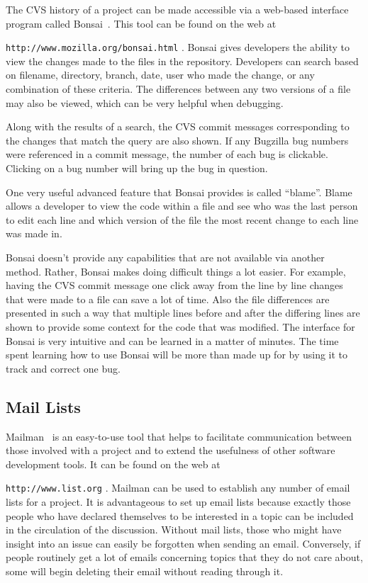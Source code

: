 \documentclass[12pt,relax]{article}
\newcommand{\InlineDirectory}[1]{
  {\hspace{0.01 in}} {\tt #1} {\hspace{0.01 in}}}
\begin{document}

The CVS history of a project can be made accessible via a
web-based interface program called Bonsai~\cite{Bonsai}.  This tool can be 
found on the web at 
\newline
\InlineDirectory{http://www.mozilla.org/bonsai.html}.
Bonsai gives developers the ability to view the changes made to the files in 
the repository. Developers can search 
based on filename, directory, branch, date, user who made the 
change, or any combination of these criteria.  The differences between any two 
versions of a file may also be viewed, which can be very helpful when 
debugging.  

Along with the results of a search, the CVS commit messages corresponding to 
the changes that match the query are also shown.  If any Bugzilla bug numbers 
were referenced in a commit message, the number of each bug is clickable.  
Clicking on a bug number will bring up the bug in question.

One very useful advanced feature that Bonsai provides is called ``blame''.  
Blame allows a developer to view the code within a file and see who was the 
last person to edit each line and which version of the file 
the most recent change to each line was made in.

Bonsai doesn't 
provide any capabilities that are not available via another method.  
Rather, Bonsai makes doing difficult things a lot easier.
For example, having the CVS commit message one click away from the line 
by line changes that
were made to a file can save a lot of time.  Also the file differences are 
presented in such a way that multiple lines before and after the differing 
lines are shown to provide some context for the code that was modified.  
The interface for Bonsai is very intuitive and can be learned in a matter of 
minutes.  The time spent learning how to use Bonsai will be more than made up 
for by using it to track and correct one bug.

\subsection{Mail Lists}

Mailman~\cite{Mailman} is an easy-to-use tool that helps to facilitate 
communication between
those involved with a project and to extend the usefulness of other 
software development tools.  It can be found on the web at 
\InlineDirectory{http://www.list.org}.  Mailman can be used to establish any 
number of 
email lists for a project.  It is advantageous to set up email lists because exactly 
those people who have declared themselves to be interested in a 
topic can be included in the circulation of the discussion.  Without 
mail lists, those who might have insight into an issue can easily be forgotten 
when sending an email.  Conversely, if people routinely get a lot of emails 
concerning topics that they do not care about, some will begin deleting
their email without reading through it.
\end{document}
